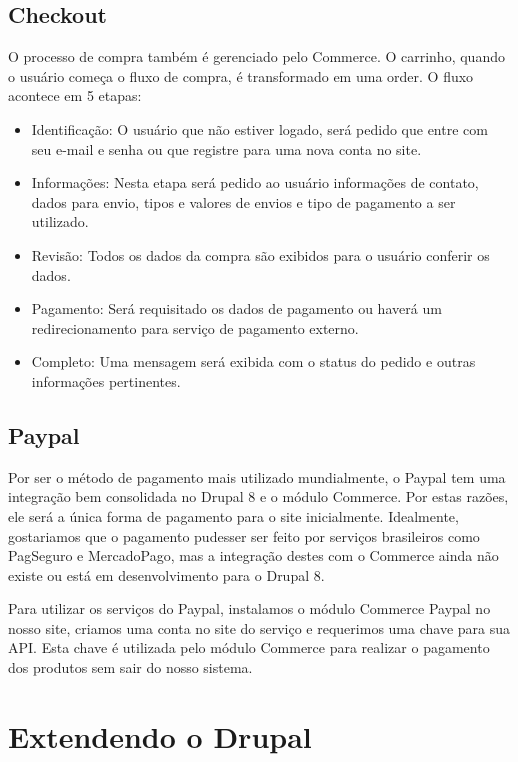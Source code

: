 \documentclass[
	12pt,				%
    oneside,			%
	a4paper,			%
	english,			%
	french,				%
	spanish,			%
	brazil				%
	]{abntex2}
\begin{document}
\subsection{Checkout}
O processo de compra também é gerenciado pelo Commerce. O carrinho, quando o usuário começa o fluxo de compra, é transformado em uma order. O fluxo acontece em 5 etapas:

\begin{itemize}
  \item Identificação: O usuário que não estiver logado, será pedido que entre com seu e-mail e senha ou que registre para uma nova conta no site.
  \item Informações: Nesta etapa será pedido ao usuário informações de contato, dados para envio, tipos e valores de envios e tipo de pagamento a ser utilizado.
  \item Revisão: Todos os dados da compra são exibidos para o usuário conferir os dados.
  \item Pagamento: Será requisitado os dados de pagamento ou haverá um redirecionamento para serviço de pagamento externo.
  \item Completo: Uma mensagem será exibida com o status do pedido e outras informações pertinentes.
\end{itemize}

\subsection{Paypal}
Por ser o método de pagamento mais utilizado mundialmente, o Paypal tem uma integração bem consolidada no Drupal 8 e o módulo Commerce. Por estas razões, ele será a única forma de pagamento para o site inicialmente. Idealmente, gostariamos que o pagamento pudesser ser feito por serviços brasileiros como PagSeguro e MercadoPago, mas a integração destes com o Commerce ainda não existe ou está em desenvolvimento para o Drupal 8.

Para utilizar os serviços do Paypal, instalamos o módulo Commerce Paypal no nosso site, criamos uma conta no site do serviço e requerimos uma chave para sua API. Esta chave é utilizada pelo módulo Commerce para realizar o pagamento dos produtos sem sair do nosso sistema.

\section{Extendendo o Drupal}
\end{document}
